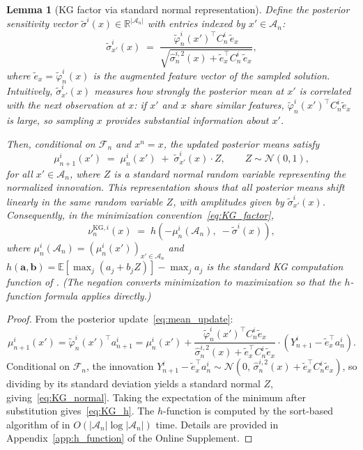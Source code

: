 \documentclass[12pt]{article}
\theoremstyle{plain}
\newtheorem{lemma}{Lemma}[section]
\theoremstyle{definition}
\theoremstyle{remark}
\begin{document}
\begin{lemma}[KG factor via standard normal representation]\label{lem:KG_distribution}
Define the \emph{posterior sensitivity vector} $\tilde{\sigma}^i(x) \in \mathbb{R}^{|\mathcal{A}_n|}$ with entries indexed by $x' \in \mathcal{A}_n$:
\begin{equation}\label{eq:sigma_tilde}
  \tilde{\sigma}^i_{x'}(x) \;=\; \frac{\tilde{\varphi}^i_n(x')^\top C^i_n\, \tilde{e}_{x}}{\sqrt{\hat{\sigma}^{i,2}_n(x) + \tilde{e}_{x}^\top C^i_n\, \tilde{e}_{x}}},
\end{equation}
where $\tilde{e}_x = \tilde{\varphi}^i_n(x)$ is the augmented feature vector of the sampled solution.  Intuitively, $\tilde{\sigma}^i_{x'}(x)$ measures how strongly the posterior mean at $x'$ is correlated with the next observation at $x$: if $x'$ and $x$ share similar features, $\tilde{\varphi}^i_n(x')^\top C^i_n \tilde{e}_x$ is large, so sampling $x$ provides substantial information about $x'$.

Then, conditional on $\mathcal{F}_n$ and $x^n = x$, the updated posterior means satisfy
\begin{equation}\label{eq:KG_normal}
  \mu^i_{n+1}(x') \;=\; \mu^i_n(x') \;+\; \tilde{\sigma}^i_{x'}(x) \cdot Z, \qquad Z \sim \mathcal{N}(0,1),
\end{equation}
for all $x' \in \mathcal{A}_n$, where $Z$ is a standard normal random variable representing the normalized innovation.  This representation shows that all posterior means shift linearly in the same random variable $Z$, with amplitudes given by $\tilde{\sigma}^i_{x'}(x)$.  Consequently, in the minimization convention~\eqref{eq:KG_factor},
\begin{equation}\label{eq:KG_h}
  \nu^{\mathrm{KG},i}_n(x) \;=\; h\!\left(-\mu^i_n(\mathcal{A}_n),\; -\tilde{\sigma}^i(x)\right),
\end{equation}
where $\mu^i_n(\mathcal{A}_n) = (\mu^i_n(x'))_{x' \in \mathcal{A}_n}$ and $h(\mathbf{a}, \mathbf{b}) = \mathbb{E}[\max_{j}(a_j + b_j Z)] - \max_j a_j$ is the standard KG computation function of \citet{Frazier2009}.  (The negation converts minimization to maximization so that the $h$-function formula applies directly.)
\end{lemma}

\begin{proof}
From the posterior update~\eqref{eq:mean_update}:
\[
  \mu^i_{n+1}(x') = \tilde{\varphi}^i_n(x')^\top a^i_{n+1}
  = \mu^i_n(x') + \frac{\tilde{\varphi}^i_n(x')^\top C^i_n \tilde{e}_x}{\hat{\sigma}^{i,2}_n(x) + \tilde{e}_x^\top C^i_n \tilde{e}_x} \cdot (Y^i_{n+1} - \tilde{e}_x^\top a^i_n).
\]
Conditional on $\mathcal{F}_n$, the innovation $Y^i_{n+1} - \tilde{e}_x^\top a^i_n \sim \mathcal{N}(0,\, \hat{\sigma}^{i,2}_n(x) + \tilde{e}_x^\top C^i_n \tilde{e}_x)$, so dividing by its standard deviation yields a standard normal $Z$, giving~\eqref{eq:KG_normal}.  Taking the expectation of the minimum after substitution gives~\eqref{eq:KG_h}.  The $h$-function is computed by the sort-based algorithm of \citet{Frazier2009} in $O(|\mathcal{A}_n| \log |\mathcal{A}_n|)$ time. Details are provided in Appendix~\ref{app:h_function} of the Online Supplement.
\end{proof}
\end{document}
